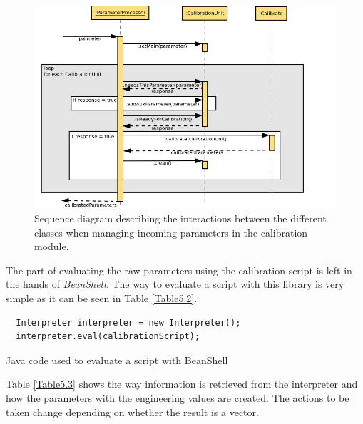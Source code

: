 \begin{figure}[H]
\centerline{\includegraphics[width=1.2\textwidth]{images/ReceiveParameterAndCalibrateSequence.png}}
\caption{Sequence diagram describing the interactions between the different classes when managing incoming parameters in the calibration module.}
\label{f5.6}
\end{figure}


The part of evaluating the raw parameters using the calibration script is left in the hands of \emph{BeanShell}. The way to evaluate a script with this library is very simple as it can be seen in Table \ref{Table5.2}. 


\begin{table}[h]
\lstset{language=Java}
\begin{lstlisting}
  Interpreter interpreter = new Interpreter();
  interpreter.eval(calibrationScript);
\end{lstlisting}
\caption{Java code used to evaluate a script with BeanShell}
\label{Table5.2}
\end{table}


Table \ref{Table5.3} shows the way information is retrieved from the interpreter and how the parameters with the engineering values are created. The actions to be taken change depending on whether the result is a vector.

